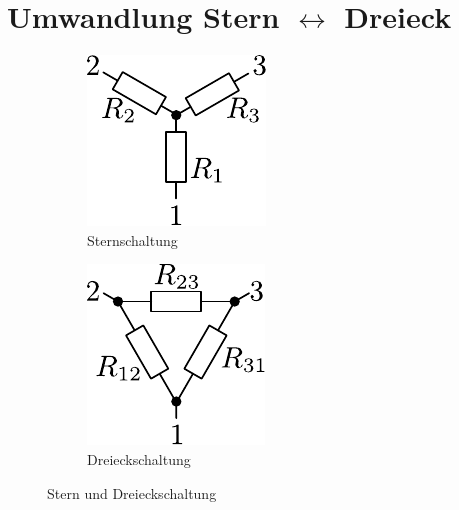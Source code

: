 



\section{Umwandlung Stern $\leftrightarrow$ Dreieck}
\begin{figure}[h!]
	\centering
	\begin{subfigure}[b]{0.4\textwidth}
		\centering
		\includegraphics[scale=\schscale]{../fig/star_sch.pdf}
		\caption{Sternschaltung}
		\label{sch:star}
	\end{subfigure}
	\begin{subfigure}[b]{0.4\textwidth}
		\centering
		\includegraphics[scale=\schscale]{../fig/tri_sch.pdf}
		\caption{Dreieckschaltung}
		\label{sch:tri}
	\end{subfigure}
	\caption{Stern und Dreieckschaltung}
	\label{sch:tristar}
\end{figure}


